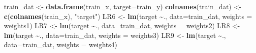 \documentclass[
]{article}
\newenvironment{Shaded}{\begin{snugshade}}{\end{snugshade}}
\newcommand{\AttributeTok}[1]{\textcolor[rgb]{0.13,0.29,0.53}{#1}}
\newcommand{\FunctionTok}[1]{\textcolor[rgb]{0.13,0.29,0.53}{\textbf{#1}}}
\newcommand{\NormalTok}[1]{#1}
\newcommand{\OtherTok}[1]{\textcolor[rgb]{0.56,0.35,0.01}{#1}}
\newcommand{\SpecialCharTok}[1]{\textcolor[rgb]{0.81,0.36,0.00}{\textbf{#1}}}
\newcommand{\StringTok}[1]{\textcolor[rgb]{0.31,0.60,0.02}{#1}}
\begin{document}
\begin{Shaded}
\begin{Highlighting}[]
\NormalTok{          train\_dat }\OtherTok{\textless{}{-}} \FunctionTok{data.frame}\NormalTok{(train\_x, }\AttributeTok{target=}\NormalTok{train\_y)}
          \FunctionTok{colnames}\NormalTok{(train\_dat) }\OtherTok{\textless{}{-}} \FunctionTok{c}\NormalTok{(}\FunctionTok{colnames}\NormalTok{(train\_x), }\StringTok{"target"}\NormalTok{)}
\NormalTok{          LR6 }\OtherTok{\textless{}{-}} \FunctionTok{lm}\NormalTok{(target }\SpecialCharTok{\textasciitilde{}}\NormalTok{., }\AttributeTok{data=}\NormalTok{train\_dat, }\AttributeTok{weights =}\NormalTok{ weights1)}
\NormalTok{          LR7 }\OtherTok{\textless{}{-}} \FunctionTok{lm}\NormalTok{(target }\SpecialCharTok{\textasciitilde{}}\NormalTok{., }\AttributeTok{data=}\NormalTok{train\_dat, }\AttributeTok{weights =}\NormalTok{ weights2)}
\NormalTok{          LR8 }\OtherTok{\textless{}{-}} \FunctionTok{lm}\NormalTok{(target }\SpecialCharTok{\textasciitilde{}}\NormalTok{., }\AttributeTok{data=}\NormalTok{train\_dat, }\AttributeTok{weights =}\NormalTok{ weights3)}
\NormalTok{          LR9 }\OtherTok{\textless{}{-}} \FunctionTok{lm}\NormalTok{(target }\SpecialCharTok{\textasciitilde{}}\NormalTok{., }\AttributeTok{data=}\NormalTok{train\_dat, }\AttributeTok{weights =}\NormalTok{ weights4)}
          

\end{Highlighting}
\end{Shaded}
\end{document}
